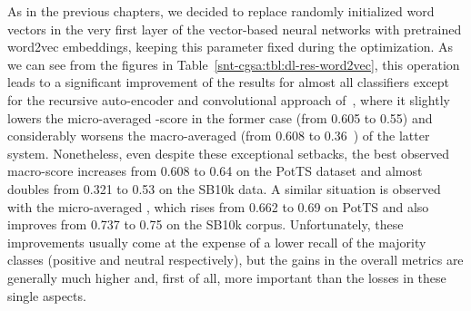 As in the previous chapters, we decided to replace randomly
initialized word vectors in the very first layer of the vector-based
neural networks with pretrained word2vec embeddings, keeping this
parameter fixed during the optimization.  As we can see from the
figures in Table~\ref{snt-cgsa:tbl:dl-res-word2vec}, this operation
leads to a significant improvement of the results for almost all
classifiers except for the recursive auto-encoder and convolutional
approach of~\citet{Severyn:15}, where it slightly lowers the
micro-averaged \F-score in the former case (from 0.605 to 0.55) and
considerably worsens the macro-averaged \F{} (from 0.608 to 0.36~\F)
of the latter system.  Nonetheless, even despite these exceptional
setbacks, the best observed macro-score increases from 0.608 to 0.64
on the PotTS dataset and almost doubles from 0.321 to 0.53 on the
SB10k data.  A similar situation is observed with the micro-averaged
\F{}, which rises from 0.662 to 0.69 on PotTS and also improves from
0.737 to 0.75 on the SB10k corpus.  Unfortunately, these improvements
usually come at the expense of a lower recall of the majority classes
(positive and neutral respectively), but the gains in the overall
metrics are generally much higher and, first of all, more important
than the losses in these single aspects.

